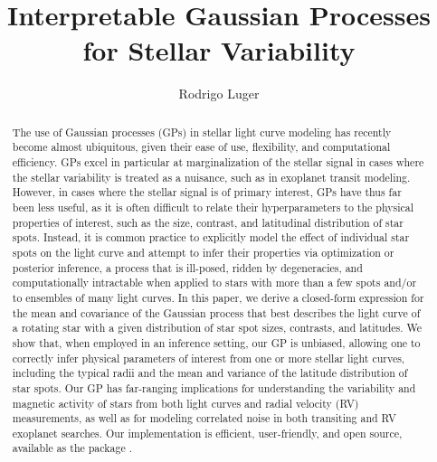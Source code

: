 \documentclass[modern]{aastex62}
\begin{document}
\title{%
    \textbf{
        Interpretable Gaussian Processes for Stellar Variability
    }
}

\author[0000-0002-0296-3826]{Rodrigo Luger}
%



\begin{abstract}
    The use of Gaussian processes (GPs) in stellar light curve modeling has recently
    become almost ubiquitous, given their ease of use, flexibility, and
    computational efficiency. GPs excel in particular at marginalization
    of the stellar signal in cases where the stellar variability is treated
    as a nuisance, such as in exoplanet transit modeling.
    However, in cases where the stellar signal is of primary interest,
    GPs have thus far been less useful, as it is often difficult to
    relate their hyperparameters to the physical properties of interest, such
    as the size, contrast, and latitudinal distribution of star spots.
    Instead, it is common practice to explicitly model the effect
    of individual star spots on the light curve and attempt to infer their
    properties via optimization or posterior inference, a process that is
    ill-posed, ridden by degeneracies, and computationally intractable when
    applied to stars with more than a few spots and/or to ensembles of many
    light curves.
    In this paper, we derive a closed-form expression for the
    mean and covariance of the Gaussian process that best describes
    the light curve of a rotating star with a given distribution of
    star spot sizes, contrasts, and latitudes.
    We show that, when employed in an inference setting, our GP is unbiased,
    allowing one to correctly infer physical parameters of interest from one
    or more stellar light curves, including
    the typical radii and the mean and variance of the latitude
    distribution of star spots.
    Our GP has far-ranging implications for understanding the variability and
    magnetic activity of stars from both light curves and radial velocity (RV)
    measurements, as well as for modeling correlated noise in both transiting
    and RV exoplanet searches.
    Our implementation is efficient, user-friendly, and open source, available
    as the \Python package \starryprocess.
    \href{https://github.com/rodluger/starry_process}{\color{linkcolor}\faGithub}
\end{abstract}
\end{document}
